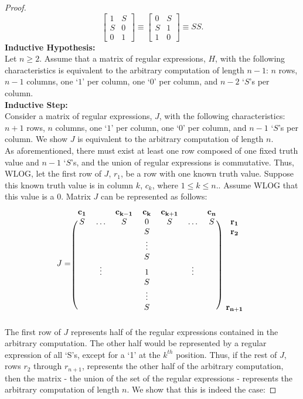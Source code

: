 \documentclass[runningheads]{llncs}
\begin{document}
\begin{proof}
$$\begin{bmatrix}
    1 & S\\
    S & 0\\
    0 & 1
    \end{bmatrix} \equiv \begin{bmatrix}
    0 & S\\
    S & 1\\
    1 & 0
    \end{bmatrix} \equiv SS.
        $$
\noindent \textbf{Inductive Hypothesis:}\\
Let $n\geq 2$. Assume that a matrix of regular expressions, $H$, with the following characteristics is equivalent to the arbitrary computation of length $n-1$: $n$ rows, $n-1$ columns, one `$1$' per column, one `$0$' per column, and $n-2$ `$S$'s per column.\\
\noindent \textbf{Inductive Step:}\\
Consider a matrix of regular expressions, $J$, with the following characteristics: $n+1$ rows, $n$ columns, one `$1$' per column, one `$0$' per column, and $n-1$ `$S$'s per column. We show $J$ is equivalent to the arbitrary computation of length $n$.\\
As aforementioned, there must exist at least one row composed of one fixed truth value and $n-1$ `$S$'s, and the union of regular expressions is commutative. Thus, WLOG, let the first row of $J$, $r_1$, be a row with one known truth value.
Suppose this known truth value is in column $k$, $c_k$, where $1 \leq k \leq n$.. Assume WLOG that this value is a 0. Matrix $J$ can be represented as follows:
\[
J = \begin{blockarray}{cccccccc}
\mathbf{c_1} & & \mathbf{c_{k-1}} & \mathbf{c_k} & \mathbf{c_{k+1}} & & \mathbf{c_n} \\
\begin{block}{(ccccccc)c}
    S & \hdots & S & 0 & S & \hdots & S & \mathbf{r_1}\\
     &  &  & S &  &  &  & \mathbf{r_2}\\
    &  &  & \vdots &  &  &  & \\
    &  & & S &  &  &  & \\
    & \vdots &  & 1 &  & \vdots &  & \\
    & &  & S &  & &  & \\
    &  &  & \vdots & &  &  & \\
    &  & & S & &  & & \mathbf{r_{n+1}}\\
\end{block}
\end{blockarray}
 \]
The first row of $J$ represents half of the regular expressions contained in the arbitrary computation. The other half would be represented by a regular expression of all `S's, except for a `1' at the $k^{th}$ position. Thus, if the rest of $J$, rows $r_2$ through $r_{n+1}$, represents the other half of the arbitrary computation, then the matrix - the union of the set of the regular expressions - represents the arbitrary computation of length $n$. We show that this is indeed the case:

\end{proof}
\end{document}
